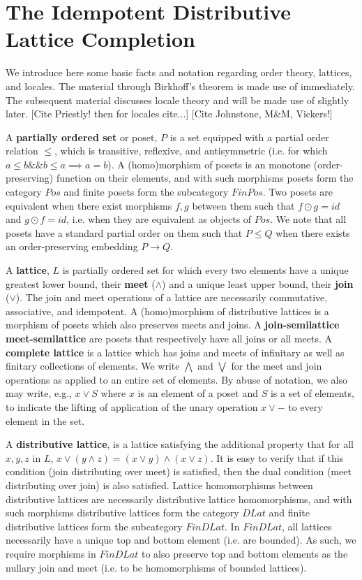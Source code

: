 \documentclass[hoptionsi,review,format=sigplan]{acmart}
\theoremstyle{definition}
\begin{document}
\section{The Idempotent Distributive Lattice Completion}

We introduce here some basic facts and notation regarding order theory, lattices, and locales. The material through Birkhoff's theorem is made use of immediately. The subsequent material discusses locale theory and will be made use of slightly later. [Cite Priestly! then for locales cite...]  [Cite Johnstone, M\&M, Vickers!]

A \textbf{partially ordered set} or poset, \(P\) is a set equipped with a partial order relation \(\le\), which is transitive,  reflexive, and antisymmetric (i.e. for which \( a \le b \mathbin{\&\&} b \le a \implies a = b\)). A (homo)morphism of posets is an monotone (order-preserving) function on their elements, and with such morphisms posets form the category \(Pos\) and finite posets form the subcategory \(FinPos\). Two posets are equivalent when there exist morphisms \(f, g\) between them such that \(f \odot g = id\) and \(g \odot f = id\), i.e. when they are equivalent as objects of \(Pos\). We note that all posets have a standard partial order on them such that \(P \le Q\) when there exists an order-preserving embedding \(P \rightarrow Q\).

A \textbf{lattice}, \(L\) is partially ordered set for which every two elements have a unique greatest lower bound, their \textbf{meet} (\(\wedge\)) and a unique least upper bound, their \textbf{join} (\(\vee\)). The join and meet operations of a lattice are necessarily commutative, associative, and idempotent. A (homo)morphism of distributive lattices is a morphism of posets which also preserves meets and joins. A \textbf{join-semilattice} \textbf{meet-semilattice} are posets that respectively have all joins or all meets. A \textbf{complete lattice} is a lattice which has joins and meets of infinitary as well as finitary collections of elements. We write \(\bigwedge\) and \(\bigvee\) for the meet and join operations as applied to an entire set of elements. By abuse of notation, we also may write, e.g., \(x \vee S\) where \(x\) is an element of a poset and \(S\) is a set of elements, to indicate the lifting of application of the unary operation \(x \vee -\) to every element in the set.

A \textbf{distributive lattice}, is a lattice satisfying the additional property that for all \(x, y, z\) in \(L\), \(x \vee (y \wedge z) = (x \vee y) \wedge (x \vee z)\). It is easy to verify that if this condition (join distributing over meet) is satisfied, then the dual condition (meet distributing over join) is also satisfied.  Lattice homomorphisms between distributive lattices are necessarily distributive lattice homomorphisms, and with such morphisms distributive lattices form the category \(DLat\) and finite distributive lattices form the subcategory \(FinDLat\). In \(FinDLat\), all lattices necessarily have a unique top and bottom element (i.e. are bounded). As such, we require morphisms in \(FinDLat\) to also preserve top and bottom elements as the nullary join and meet (i.e. to be homomorphisms of bounded lattices).
\end{document}
